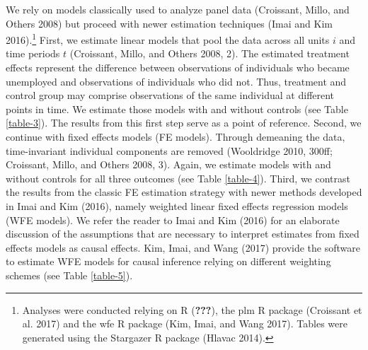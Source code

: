 \documentclass[12pt,]{article}
\let\rmarkdownfootnote\footnote%
\def\footnote{\protect\rmarkdownfootnote}
\begin{document}
We rely on models classically used to analyze panel data (Croissant, Millo, and Others 2008) but proceed with newer estimation techniques (Imai and Kim 2016).\footnote{Analyses were conducted relying on R ({\textbf{???}}), the plm R package (Croissant et al. 2017) and the wfe R package (Kim, Imai, and Wang 2017). Tables were generated using the Stargazer R package (Hlavac 2014).} First, we estimate linear models that pool the data across all units \(i\) and time periods \(t\) (Croissant, Millo, and Others 2008, 2). The estimated treatment effects represent the difference between observations of individuals who became unemployed and observations of individuals who did not. Thus, treatment and control group may comprise observations of the same individual at different points in time. We estimate those models with and without controls (see Table \ref{table-3}). The results from this first step serve as a point of reference. Second, we continue with fixed effects models (FE models). Through demeaning the data, time-invariant individual components are removed (Wooldridge 2010, 300ff; Croissant, Millo, and Others 2008, 3). Again, we estimate models with and without controls for all three outcomes (see Table \ref{table-4}).
Third, we contrast the results from the classic FE estimation strategy with newer methods developed in Imai and Kim (2016), namely weighted linear fixed effects regression models (WFE models). We refer the reader to Imai and Kim (2016) for an elaborate discussion of the assumptions that are necessary to interpret estimates from fixed effects models as causal effects. Kim, Imai, and Wang (2017) provide the software to estimate WFE models for causal inference relying on different weighting schemes (see Table \ref{table-5}).\\
\end{document}
